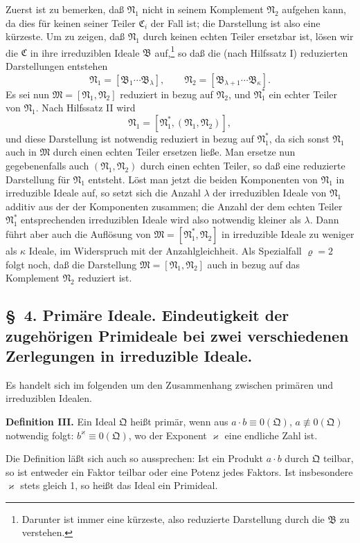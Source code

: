 \documentclass[11pt]{article}
\newcommand{\ideal}[1]{\mathfrak{#1}}
\begin{document}
Zuerst ist zu bemerken, daß $\ideal N_1$ nicht in seinem Komplement $\ideal N_2$ aufgehen kann, da dies für keinen seiner Teiler $\ideal C_i$ der Fall ist; die Darstellung ist also eine kürzeste. Um zu zeigen, daß $\ideal N_1$ durch keinen echten Teiler ersetzbar ist, lösen wir die $\ideal C$ in ihre irreduziblen Ideale $\ideal B$ auf,\footnote{Darunter ist immer eine kürzeste, also reduzierte Darstellung durch die $\ideal B$ zu verstehen.} so daß die (nach Hilfssatz I) reduzierten Darstellungen entstehen
\[
 \ideal N_1=[\ideal B_1\cdots\ideal B_\lambda],
 \qquad
 \ideal N_2=[\ideal B_{\lambda+1}\cdots\ideal B_\kappa].
\]
Es sei nun $\ideal M=[\ideal N_1,\ideal N_2]$ reduziert in bezug auf $\ideal N_2$, und $\ideal N_1^*$ ein echter Teiler von $\ideal N_1$. Nach Hilfssatz II wird
\[
 \ideal N_1=[\ideal N_1^*,(\ideal N_1,\ideal N_2)],
\]
und diese Darstellung ist notwendig reduziert in bezug auf $\ideal N_1^*$, da sich sonst $\ideal N_1$ auch in $\ideal M$ durch einen echten Teiler ersetzen ließe. Man ersetze nun gegebenenfalls auch $(\ideal N_1,\ideal N_2)$ durch einen echten Teiler, so daß eine reduzierte Darstellung für $\ideal N_1$ entsteht. Löst man jetzt die beiden Komponenten von $\ideal N_1$ in irreduzible Ideale auf, so setzt sich die Anzahl $\lambda$ der irreduziblen Ideale von $\ideal N_1$ additiv aus der der Komponenten zusammen; die Anzahl der dem echten Teiler $\ideal N_1^*$ entsprechenden irreduziblen Ideale wird also notwendig kleiner als $\lambda$. Dann führt aber auch die Auflösung von $\ideal M=[\ideal N_1^*,\ideal N_2]$ in irreduzible Ideale zu weniger als $\kappa$ Ideale, im Widerspruch mit der Anzahlgleichheit. Als Spezialfall $\varrho=2$ folgt noch, daß die Darstellung $\ideal M=[\ideal N_1,\ideal N_2]$ auch in bezug auf das Komplement $\ideal N_2$ reduziert ist.

\subsection*{\S~4. Primäre Ideale. Eindeutigkeit der zugehörigen Primideale bei zwei verschiedenen Zerlegungen in irreduzible Ideale.}

Es handelt sich im folgenden um den Zusammenhang zwischen primären und irreduziblen Idealen.

\textbf{Definition III.} Ein Ideal $\ideal Q$ heißt primär, wenn aus $a\cdot b\equiv0(\ideal Q)$, $a\not\equiv0(\ideal Q)$ notwendig folgt: $b^\varkappa\equiv0(\ideal Q)$, wo der Exponent $\varkappa$ eine endliche Zahl ist.

Die Definition läßt sich auch so aussprechen: Ist ein Produkt $a\cdot b$ durch $\ideal Q$ teilbar, so ist entweder ein Faktor teilbar oder eine Potenz jedes Faktors. Ist insbesondere $\varkappa$ stets gleich 1, so heißt das Ideal ein Primideal.
\end{document}
